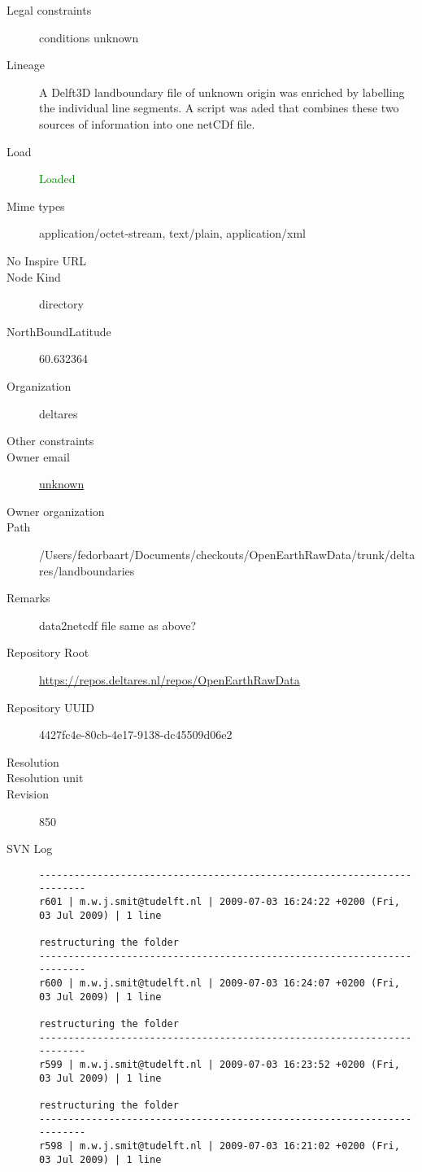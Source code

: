 \documentclass[9]{report}
\begin{document}
\begin{description}
  \item[Legal constraints] conditions unknown
  \item[Lineage] A Delft3D landboundary file of unknown origin was enriched by labelling the individual line segments. A script was aded that combines these two sources of information into one netCDf file.
  \item[Load] \textcolor{green}{Loaded}
  \item[Mime types] application/octet-stream, text/plain, application/xml
  \item[No Inspire URL] 
  \item[Node Kind] directory
  \item[NorthBoundLatitude] 60.632364
  \item[Organization] deltares
  \item[Other constraints] 
  \item[Owner email] \href{mailto:unknown}{unknown}
  \item[Owner organization] 
  \item[Path] /Users/fedorbaart/Documents/checkouts/OpenEarthRawData/trunk/deltares/landboundaries
  \item[Remarks] data2netcdf file same as above?
  \item[Repository Root] \href{https://repos.deltares.nl/repos/OpenEarthRawData}{https://repos.deltares.nl/repos/OpenEarthRawData}
  \item[Repository UUID] 4427fc4e-80cb-4e17-9138-dc45509d06e2
  \item[Resolution] 
  \item[Resolution unit] 
  \item[Revision] 850
  \item[SVN Log] \begin{verbatim}
------------------------------------------------------------------------
r601 | m.w.j.smit@tudelft.nl | 2009-07-03 16:24:22 +0200 (Fri, 03 Jul 2009) | 1 line

restructuring the folder
------------------------------------------------------------------------
r600 | m.w.j.smit@tudelft.nl | 2009-07-03 16:24:07 +0200 (Fri, 03 Jul 2009) | 1 line

restructuring the folder
------------------------------------------------------------------------
r599 | m.w.j.smit@tudelft.nl | 2009-07-03 16:23:52 +0200 (Fri, 03 Jul 2009) | 1 line

restructuring the folder
------------------------------------------------------------------------
r598 | m.w.j.smit@tudelft.nl | 2009-07-03 16:21:02 +0200 (Fri, 03 Jul 2009) | 1 line


\end{verbatim}
\end{description}
\end{document}
